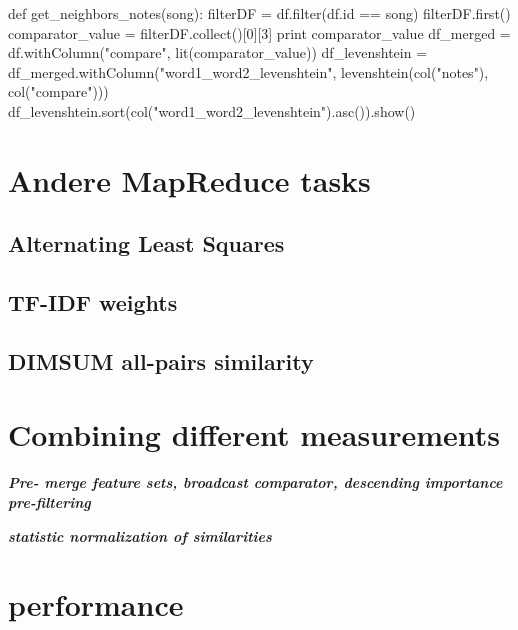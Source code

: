 \begin{pythonCode}
def get_neighbors_notes(song):
    filterDF = df.filter(df.id == song)
    filterDF.first()
    comparator_value = filterDF.collect()[0][3] 
    print comparator_value
    df_merged = df.withColumn("compare", lit(comparator_value))
    df_levenshtein = df_merged.withColumn("word1_word2_levenshtein", levenshtein(col("notes"), col("compare")))
    df_levenshtein.sort(col("word1_word2_levenshtein").asc()).show()
\end{pythonCode}

\section{Andere MapReduce tasks}

\subsection{Alternating Least Squares}

\subsection{TF-IDF weights}

\subsection{DIMSUM all-pairs similarity}

\section{Combining different measurements}

\textit{\textbf{Pre- merge feature sets, broadcast comparator, descending importance pre-filtering}}

\textit{\textbf{statistic normalization of similarities}}

\section{performance}


